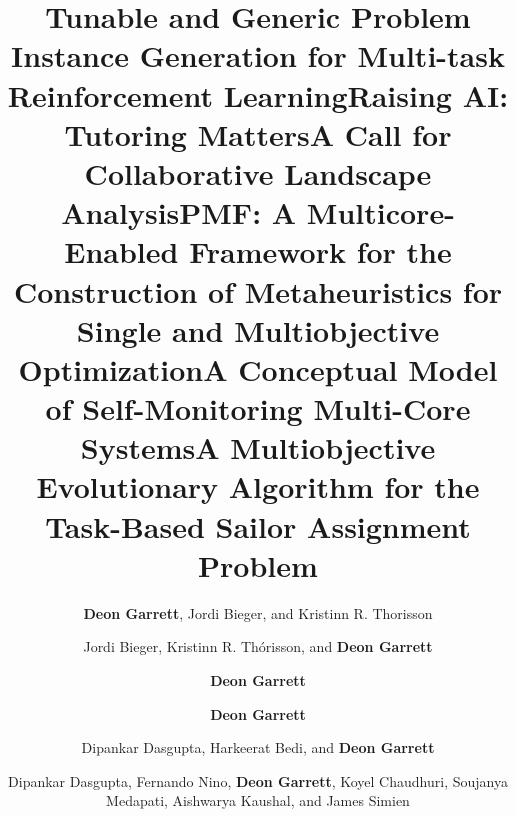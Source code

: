 \documentclass[a4paper,10pt]{cvclean}
\begin{document}
\begin{publications}
  \begin{conferencepapers}
    \begin{paper}
      \title{Tunable and Generic Problem Instance Generation for Multi-task
        Reinforcement Learning}
      \author{\textbf{Deon Garrett}, Jordi Bieger, and Kristinn R. Thorisson}
    \end{paper}
    \begin{paper}
      \title{Raising AI: Tutoring Matters}
      \author{Jordi Bieger, Kristinn R. Thórisson, and \textbf{Deon Garrett}}
    \end{paper}
    \begin{paper}
      \title{A Call for Collaborative Landscape Analysis}
      \author{\textbf{Deon Garrett}}
    \end{paper}
    \begin{paper}
      \title{PMF: A Multicore-Enabled Framework for the Construction of
        Metaheuristics for Single and Multiobjective Optimization}
      \author{\textbf{Deon Garrett}}
    \end{paper}
    \begin{paper}
      \title{A Conceptual Model of Self-Monitoring Multi-Core Systems}
      \author{Dipankar Dasgupta, Harkeerat Bedi, and \textbf{Deon Garrett}}
    \end{paper}
    \begin{paper}
      \title{A Multiobjective Evolutionary Algorithm for the Task-Based Sailor
        Assignment Problem}
      \author{Dipankar Dasgupta, Fernando Nino, \textbf{Deon Garrett}, Koyel Chaudhuri,
        Soujanya Medapati, Aishwarya Kaushal, and James Simien}
    \end{paper}

\end{conferencepapers}
\end{publications}
\end{document}
